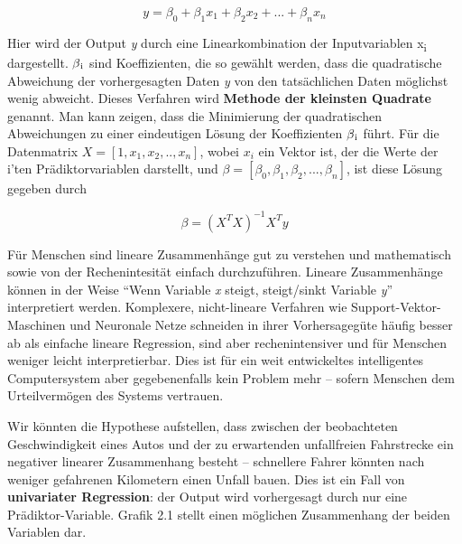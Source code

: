 \begin{equation*}
y = \beta_0 + \beta_1 x_1 + \beta_2 x_2 + ... + \beta_n x_n
\end{equation*}

Hier wird der Output \emph{y} durch eine Linearkombination der Inputvariablen
x\textsubscript{i} dargestellt. $\beta \textsubscript{i}$ sind Koeffizienten, die so
gewählt werden, dass die quadratische Abweichung der vorhergesagten Daten \emph{y}
von den tatsächlichen Daten möglichst wenig abweicht. Dieses Verfahren wird
\textbf{Methode der kleinsten Quadrate} genannt. Man kann zeigen, dass die
Minimierung der quadratischen Abweichungen zu einer eindeutigen Lösung der
Koeffizienten $\beta \textsubscript{i}$ führt. Für die Datenmatrix $X = [1, x_1, x_2,
  .., x_n]$, wobei $x_i$ ein Vektor ist, der die Werte der i'ten Prädiktorvariablen
darstellt, und $\beta = [\beta_0, \beta_1, \beta_2, ..., \beta_n]$, ist diese Lösung
gegeben durch

\begin{equation*}
\beta = (X^TX)^{-1}X^Ty
\end{equation*}

Für Menschen sind lineare Zusammenhänge gut zu verstehen und mathematisch sowie von
der Rechenintesität einfach durchzuführen. Lineare Zusammenhänge können in der Weise
"`Wenn Variable \emph{x} steigt, steigt/sinkt Variable \emph{y}"' interpretiert
werden. Komplexere, nicht-lineare Verfahren wie Support-Vektor-Maschinen und
Neuronale Netze schneiden in ihrer Vorhersagegüte häufig besser ab als einfache
lineare Regression, sind aber rechenintensiver und für Menschen weniger leicht
interpretierbar. Dies ist für ein weit entwickeltes intelligentes Computersystem aber
gegebenenfalls kein Problem mehr -- sofern Menschen dem Urteilvermögen des Systems
vertrauen.

Wir könnten die Hypothese aufstellen, dass zwischen der beobachteten Geschwindigkeit
eines Autos und der zu erwartenden unfallfreien Fahrstrecke ein negativer linearer
Zusammenhang besteht -- schnellere Fahrer könnten nach weniger gefahrenen Kilometern
einen Unfall bauen. Dies ist ein Fall von \textbf{univariater Regression}: der Output
wird vorhergesagt durch nur eine Prädiktor-Variable. Grafik 2.1 stellt einen
möglichen Zusammenhang der beiden Variablen dar.

